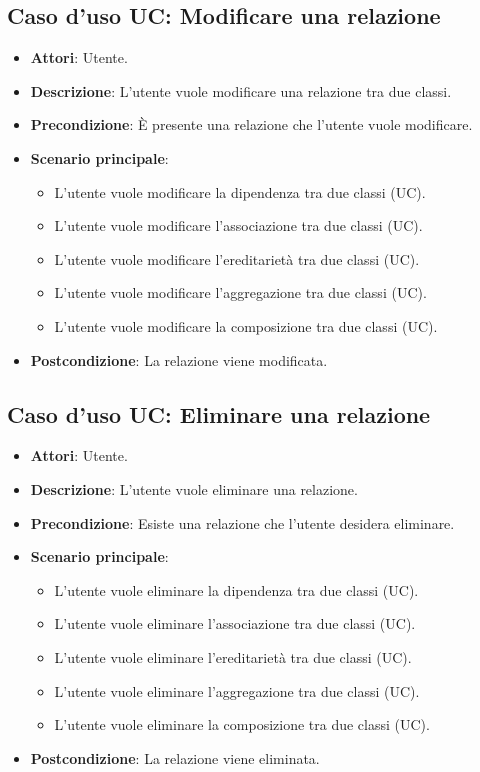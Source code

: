 \documentclass[../AnalisiDeiRequisiti.tex]{subfiles}
\begin{document}
		\subsection{Caso d'uso UC: Modificare una relazione}
		\begin{itemize}
			\item\textbf{Attori}: Utente.
			\item\textbf{Descrizione}: L'utente vuole modificare una relazione tra due classi.
			\item\textbf{Precondizione}: È presente una relazione che l'utente vuole modificare.
			\item\textbf{Scenario principale}: 
			\begin{itemize}
				\item L'utente vuole modificare la dipendenza tra due classi (UC).
				\item L'utente vuole modificare l'associazione tra due classi (UC).
				\item L'utente vuole modificare l'ereditarietà tra due classi (UC).
				\item L'utente vuole modificare l'aggregazione tra due classi (UC).
				\item L'utente vuole modificare la composizione tra due classi (UC).
			\end{itemize}
			\item\textbf{Postcondizione}: La relazione viene modificata.
		\end{itemize}
		
		\subsection{Caso d'uso UC: Eliminare una relazione}
		\begin{itemize}
			\item\textbf{Attori}: Utente.
			\item\textbf{Descrizione}: L'utente vuole eliminare una relazione.
			\item\textbf{Precondizione}: Esiste una relazione che l'utente desidera eliminare.
			\item\textbf{Scenario principale}: 
			\begin{itemize}
				\item L'utente vuole eliminare la dipendenza tra due classi (UC).
				\item L'utente vuole eliminare l'associazione tra due classi (UC).
				\item L'utente vuole eliminare l'ereditarietà tra due classi (UC).
				\item L'utente vuole eliminare l'aggregazione tra due classi (UC).
				\item L'utente vuole eliminare la composizione tra due classi (UC).
			\end{itemize}
			\item\textbf{Postcondizione}: La relazione viene eliminata.
		\end{itemize}
		
\end{document}
